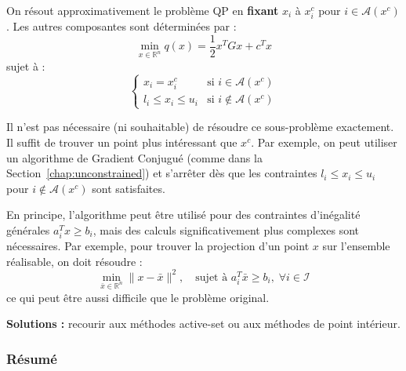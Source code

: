 On résout approximativement le problème QP en \textbf{fixant} $x_i$ à $x_i^c$ pour $i \in \mathcal{A}(x^c)$.
Les autres composantes sont déterminées par :
\begin{equation}
    \min_{x \in \mathbb{R}^n} q(x) = \frac{1}{2} x^T G x + c^T x
\end{equation}
sujet à :
\begin{equation}
    \begin{cases}
        x_i = x_i^c & \text{si } i \in \mathcal{A}(x^c) \\
        l_i \le x_i \le u_i & \text{si } i \notin \mathcal{A}(x^c)
    \end{cases}
\end{equation}

\begin{remarque}
    Il n'est pas nécessaire (ni souhaitable) de résoudre ce sous-problème exactement. Il suffit de trouver un point plus intéressant que $x^c$.
    Par exemple, on peut utiliser un algorithme de Gradient Conjugué (comme dans la Section~\ref{chap:unconstrained}) et s'arrêter dès que les contraintes $l_i \le x_i \le u_i$ pour $i \notin \mathcal{A}(x^c)$ sont satisfaites.
\end{remarque}

\begin{remarque}
    En principe, l'algorithme peut être utilisé pour des contraintes d'inégalité générales $a_i^T x \ge b_i$, mais des calculs significativement plus complexes sont nécessaires.
    Par exemple, pour trouver la projection d'un point $x$ sur l'ensemble réalisable, on doit résoudre :
    \begin{equation}
        \min_{\bar{x} \in \mathbb{R}^n} \|x - \bar{x}\|^2, \quad \text{sujet à } a_i^T \bar{x} \ge b_i, \; \forall i \in \mathcal{I}
    \end{equation}
    ce qui peut être aussi difficile que le problème original.
    
    \textbf{Solutions :} recourir aux méthodes active-set ou aux méthodes de point intérieur.
\end{remarque}

\subsubsection{Résumé}


